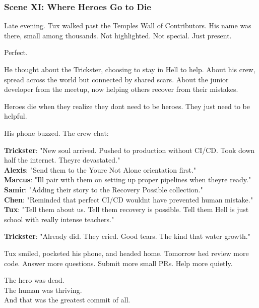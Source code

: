 \bookdivider

\subsubsection{Scene XI: Where Heroes Go to Die}\label{scene-xi-where-heroes-go-to-die}

Late evening. Tux walked past the Temple\textquotesingle s Wall of Contributors. His name was there, small among thousands. Not highlighted. Not special. Just present.

Perfect.

He thought about the Trickster, choosing to stay in Hell to help. About his crew, spread across the world but connected by shared scars. About the junior developer from the meetup, now helping others recover from their mistakes.

Heroes die when they realize they don\textquotesingle t need to be heroes. They just need to be helpful.

His phone buzzed. The crew chat:

\textbf{Trickster}: "New soul arrived. Pushed to production without CI/CD. Took down half the internet. They\textquotesingle re devastated."\\
\textbf{Alexis}: "Send them to the \textquotesingle You\textquotesingle re Not Alone\textquotesingle{} orientation first."\\
\textbf{Marcus}: "I\textquotesingle ll pair with them on setting up proper pipelines when they\textquotesingle re ready."\\
\textbf{Samir}: "Adding their story to the \textquotesingle Recovery Possible\textquotesingle{} collection."\\
\textbf{Chen}: "Reminded that perfect CI/CD wouldn\textquotesingle t have prevented human mistake."\\
\textbf{Tux}: "Tell them about us. Tell them recovery is possible. Tell them Hell is just school with really intense teachers."

\textbf{Trickster}: "Already did. They cried. Good tears. The kind that water growth."

Tux smiled, pocketed his phone, and headed home. Tomorrow he\textquotesingle d review more code. Answer more questions. Submit more small PRs. Help more quietly.

The hero was dead.\\
The human was thriving.\\
And that was the greatest commit of all.


